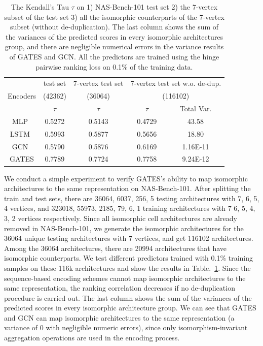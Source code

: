 \begin{table}[tb]
\begin{center}
\caption{The Kendall's Tau $\tau$ on 1) NAS-Bench-101 test set 2) the 7-vertex subset of the test set 3) all the isomorphic counterparts of the 7-vertex subset (without de-duplication). The last column shows the sum of the variances of the predicted scores in every isomorphic architectures group, and there are negligible numerical errors in the variance results of GATES and GCN. All the predictors are trained using the hinge pairwise ranking loss on 0.1\% of the training data.}
\label{table:iso-nb101}
\begin{tabular}{c@{\hskip 0.02\linewidth}cccc}
\toprule
\multirow{3}{*}{Encoders} & test set & 7-vertex test set & \multicolumn{2}{c}{7-vertex test set w.o. de-dup.} \\ 
& (42362) & (36064) & \multicolumn{2}{c}{(116102)} \\\cmidrule(lr){2-2}\cmidrule(lr){3-3}\cmidrule(lr){4-5}
& $\tau$   &$\tau$ & $\tau$  & Total Var.  \\\midrule
MLP~\cite{wang2018alphax}  & 0.5272 & 0.5143 & 0.4729 & 43.58    \\
LSTM~\cite{wang2018alphax} & 0.5993 & 0.5877 & 0.5656 & 18.80    \\
GCN~\cite{shi2019multi}    & 0.5790 & 0.5876 & 0.6169 & 1.16E-11 \\\hline
GATES                      & 0.7789 & 0.7724 & 0.7758 & 9.24E-12 \\ \bottomrule
\end{tabular}
\end{center}
\end{table}

We conduct a simple experiment to verify GATES's ability to map isomorphic architectures to the same representation on NAS-Bench-101.
After splitting the train and test sets, there are 36064, 6037, 256, 5 testing architectures with 7, 6, 5, 4 vertices, and 323018, 55973, 2185, 79, 6, 1 training architectures with 7 6, 5, 4, 3, 2 vertices respectively.
Since all isomorphic cell architectures are already removed in NAS-Bench-101, we generate the isomorphic architectures for the 36064 unique testing architectures with 7 vertices, and get 116102 architectures. Among the 36064 architectures, there are 20994 architectures that have isomorphic counterparts. We test different predictors trained with 0.1\% training samples on these 116k architectures and show the results in Table.~\ref{table:iso-nb101}. Since the sequence-based encoding schemes cannot map isomorphic architectures to the same representation, the ranking correlation decreases if no de-duplication procedure is carried out. The last column shows the sum of the variances of the predicted scores in every isomorphic architecture group. We can see that GATES and GCN can map isomorphic architectures to the same representation (a variance of 0 with negligible numeric errors), since only isomorphism-invariant aggregation operations are used in the encoding process.


